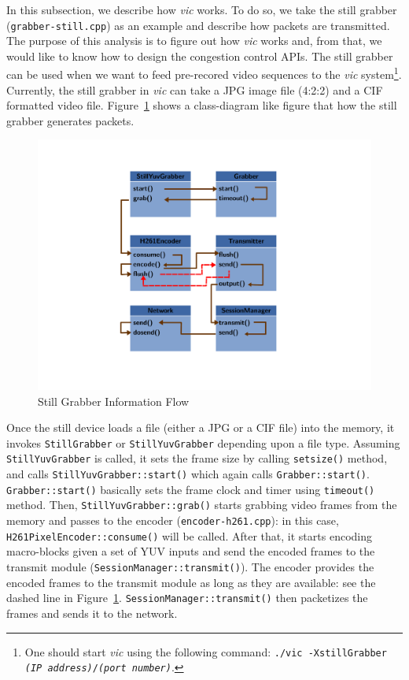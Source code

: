 In this subsection, we describe how \emph{vic} works. To do so, we take the
still grabber (\texttt{grabber-still.cpp}) as an example and describe how
packets are transmitted.  The purpose of this analysis is to figure out how
\emph{vic} works and, from that, we would like to know how to design the
congestion control APIs. The still grabber can be used when we want to feed
pre-recored video sequences to the \emph{vic} system\footnote{One should start
\emph{vic} using the following command: \texttt{./vic -XstillGrabber \emph{(IP
address)}/\emph{(port number)}}.}. Currently, the still grabber in \emph{vic}
can take a JPG image file (4:2:2) and a CIF formatted video file.
Figure~\ref{fig:still-grabber} shows a class-diagram like figure that how the
still grabber generates packets. \\

\begin{figure}[!h] 
\begin{center}
\includegraphics[scale=.5]{./img/still-grabber}
\caption{\label{fig:still-grabber}Still Grabber Information Flow}
\end{center} 
\end{figure}

Once the still device loads a file (either a JPG or a CIF file) into the memory,
it invokes \texttt{StillGrabber} or \texttt{StillYuvGrabber} depending upon a
file type. Assuming \texttt{StillYuvGrabber} is called, it sets the frame size
by calling \texttt{setsize()} method, and calls
\texttt{StillYuvGrabber::start()} which again calls \texttt{Grabber::start()}.
\texttt{Grabber::start()} basically sets the frame clock and timer using
\texttt{timeout()} method.  Then, \texttt{StillYuvGrabber::grab()} starts
grabbing video frames from the memory and passes to the encoder
(\texttt{encoder-h261.cpp}): in this case, \texttt{H261PixelEncoder::consume()}
will be called. After that, it starts encoding macro-blocks given a set of YUV
inputs and send the encoded frames to the transmit module
(\texttt{SessionManager::transmit()}). The encoder provides the encoded frames
to the transmit module as long as they are available: see the dashed line in
Figure~\ref{fig:still-grabber}.  \texttt{SessionManager::transmit()} then
packetizes the frames and sends it to the network. \\

